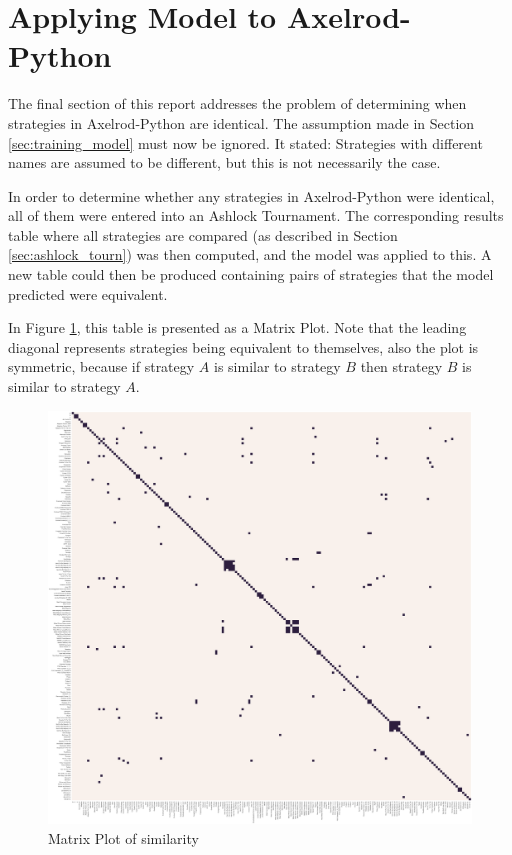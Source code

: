 \section{Applying Model to Axelrod-Python}

The final section of this report addresses the problem of determining when strategies in Axelrod-Python are identical.
The assumption made in Section \ref{sec:training_model} must now be ignored.
It stated: Strategies with different names are assumed to be different, but this is not necessarily the case.

In order to determine whether any strategies in Axelrod-Python were identical, all of them were entered into an Ashlock Tournament.
The corresponding results table where all strategies are compared (as described in Section \ref{sec:ashlock_tourn}) was then computed, and the model was applied to this.
A new table could then be produced containing pairs of strategies that the model predicted were equivalent.

In Figure \ref{fig:matrix_similarity}, this table is presented as a Matrix Plot.
Note that the leading diagonal represents strategies being equivalent to themselves, also the plot is symmetric, because if strategy $A$ is similar to strategy $B$ then strategy $B$ is similar to strategy $A$.

\begin{figure}[htbp!]
    \centering
    \includegraphics[width=0.8\linewidth]{../img/ML/similarity_heatmap.png}
    \caption{Matrix Plot of similarity}
    \label{fig:matrix_similarity}
\end{figure}

